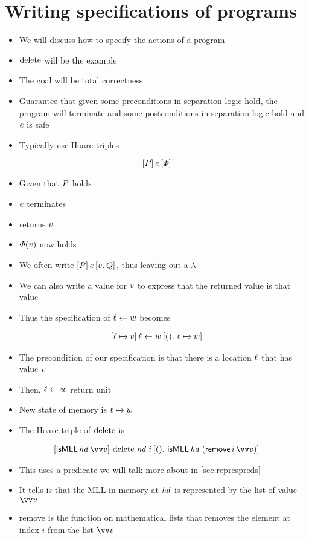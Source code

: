\documentclass[thesis.tex]{subfiles}
\begin{document}
\section{Writing specifications of programs}
\label{sec:Hoare}
\begin{itemize}
  \item We will discuss how to specify the actions of a program
  \item $\operatorname{delete}$ will be the example
  \item The goal will be total correctness
  \item Guarantee that given some preconditions in separation logic hold, the program will terminate and some postconditions in separation logic hold and $e$ is safe
  \item Typically use Hoare triples
\end{itemize}
\[\hoare{\prop}{\expr}{\pred}\]
\begin{itemize}
  \item Given that $P$ holds
  \item $e$ terminates
  \item returns $v$
  \item $\varPhi(v)$ now holds
  \item We often write $\hoare{\prop}{\expr}{\Ret\val. \propB}$, thus leaving out a $\lambda$
  \item We can also write a value for $v$ to express that the returned value is that value
  \item Thus the specification of $\ell\leftarrow w$ becomes
\end{itemize}
\begin{align*}
  \hoare{\loc\fmapsto\val}{\loc\gets\valB}{().\ \loc\fmapsto\valB}
\end{align*}
\begin{itemize}
  \item The precondition of our specification is that there is a location $\ell$ that has value $v$
  \item Then, $\ell\leftarrow w$ return unit
  \item New state of memory is $\loc\fmapsto\valB$
  \item The Hoare triple of $\operatorname{delete}$ is
\end{itemize}
\begin{align*}
  \hoare{\textlog{isMLL}\, \langv{hd}\, \vect{\val}}{\MLLdelete\, \langv{hd}\; \iindex }{().\ \textlog{isMLL}\, \langv{hd}\; (\textlog{remove}\, \iindex\, \vect{v})}
\end{align*}
\begin{itemize}
  \item This uses a predicate we will talk more about in \cref*{sec:represpreds}
  \item It tells is that the MLL in memory at $\mathit{hd}$ is represented by the list of value $\vect{v}$
  \item remove is the function on mathematical lists that removes the element at index $i$ from the list $\vect{v}$
\end{itemize}
\end{document}
